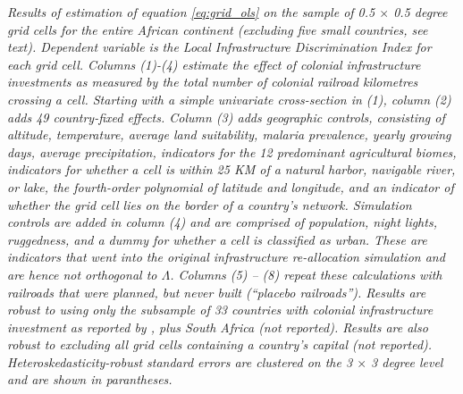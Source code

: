 \documentclass[11pt, oneside]{article}   	%
\newcommand{\mysubcaption}[1]{
\justify
\begin{spacing}{0.7}
\textit{\footnotesize #1}
\end{spacing}}
\begin{document}
\begin{table}[t]
\mysubcaption{Results of estimation of equation \eqref{eq:grid_ols} on the sample of 0.5 $\times$ 0.5 degree grid cells for the entire African continent (excluding five small countries, see text). Dependent variable is the Local Infrastructure Discrimination Index for each grid cell. Columns (1)-(4) estimate the effect of colonial infrastructure investments as measured by the total number of colonial railroad kilometres crossing a cell. Starting with a simple univariate cross-section in (1), column (2) adds 49 country-fixed effects. Column (3) adds geographic controls, consisting of altitude, temperature, average land suitability, malaria prevalence, yearly growing days, average precipitation, indicators for the 12 predominant agricultural biomes, indicators for whether a cell is within 25 KM of a natural harbor, navigable river, or lake, the fourth-order polynomial of latitude and longitude, and an indicator of whether the grid cell lies on the border of a country's network. Simulation controls are added in column (4) and are comprised of population, night lights, ruggedness, and a dummy for whether a cell is classified as urban. These are indicators that went into the original infrastructure re-allocation simulation and are hence not orthogonal to $\Lambda$. Columns (5) -- (8) repeat these calculations with railroads that were planned, but never built (``placebo railroads''). Results are robust to using only the subsample of 33 countries with colonial infrastructure investment as reported by \cite{jedwab_permanent_2016}, plus South Africa (not reported). Results are also robust to excluding all grid cells containing a country's capital (not reported). Heteroskedasticity-robust standard errors are clustered on the 3 $\times$ 3 degree level and are shown in parantheses.}
\end{table}
\end{document}

